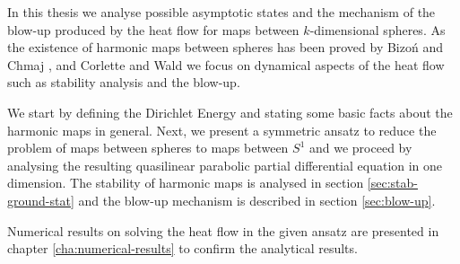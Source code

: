 In this thesis we analyse possible asymptotic states and the mechanism
of the blow-up produced by the heat flow for maps between
$k$-dimensional spheres. As the existence of harmonic maps between
spheres has been proved by Bizoń and Chmaj \cite{Bizon1997}, and
Corlette and Wald \cite{Corlette2001} we focus on dynamical aspects of
the heat flow such as stability analysis and the blow-up.

We start by defining the Dirichlet Energy and stating some basic facts
about the harmonic maps in general. Next, we present a symmetric
ansatz to reduce the problem of maps between spheres to maps between
$S^1$ and we proceed by analysing the resulting quasilinear parabolic
partial differential equation in one dimension. The stability of
harmonic maps is analysed in section \ref{sec:stab-ground-stat} and
the blow-up mechanism is described in section \ref{sec:blow-up}.

Numerical results on solving the heat flow in the given ansatz are
presented in chapter \ref{cha:numerical-results} to confirm the
analytical results.



